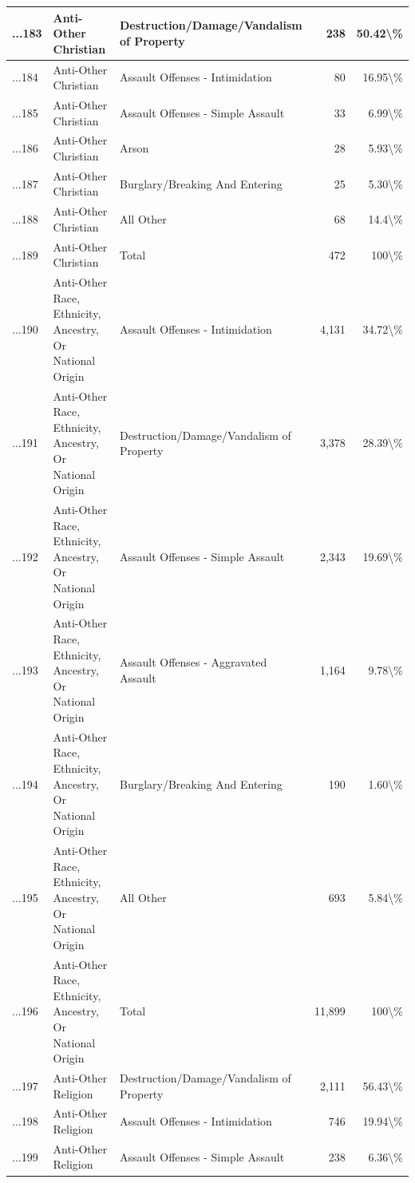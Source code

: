 \documentclass[
]{krantz}
\begin{document}
\begin{longtable}[t]{l|l|l|r|r}
\hline
...183 & Anti-Other Christian & Destruction/Damage/Vandalism of Property & 238 & 50.42\textbackslash{}\%\\
\hline
...184 & Anti-Other Christian & Assault Offenses - Intimidation & 80 & 16.95\textbackslash{}\%\\
\hline
...185 & Anti-Other Christian & Assault Offenses - Simple Assault & 33 & 6.99\textbackslash{}\%\\
\hline
...186 & Anti-Other Christian & Arson & 28 & 5.93\textbackslash{}\%\\
\hline
...187 & Anti-Other Christian & Burglary/Breaking And Entering & 25 & 5.30\textbackslash{}\%\\
\hline
...188 & Anti-Other Christian & All Other & 68 & 14.4\textbackslash{}\%\\
\hline
...189 & Anti-Other Christian & Total & 472 & 100\textbackslash{}\%\\
\hline
...190 & Anti-Other Race, Ethnicity, Ancestry, Or National Origin & Assault Offenses - Intimidation & 4,131 & 34.72\textbackslash{}\%\\
\hline
...191 & Anti-Other Race, Ethnicity, Ancestry, Or National Origin & Destruction/Damage/Vandalism of Property & 3,378 & 28.39\textbackslash{}\%\\
\hline
...192 & Anti-Other Race, Ethnicity, Ancestry, Or National Origin & Assault Offenses - Simple Assault & 2,343 & 19.69\textbackslash{}\%\\
\hline
...193 & Anti-Other Race, Ethnicity, Ancestry, Or National Origin & Assault Offenses - Aggravated Assault & 1,164 & 9.78\textbackslash{}\%\\
\hline
...194 & Anti-Other Race, Ethnicity, Ancestry, Or National Origin & Burglary/Breaking And Entering & 190 & 1.60\textbackslash{}\%\\
\hline
...195 & Anti-Other Race, Ethnicity, Ancestry, Or National Origin & All Other & 693 & 5.84\textbackslash{}\%\\
\hline
...196 & Anti-Other Race, Ethnicity, Ancestry, Or National Origin & Total & 11,899 & 100\textbackslash{}\%\\
\hline
...197 & Anti-Other Religion & Destruction/Damage/Vandalism of Property & 2,111 & 56.43\textbackslash{}\%\\
\hline
...198 & Anti-Other Religion & Assault Offenses - Intimidation & 746 & 19.94\textbackslash{}\%\\
\hline
...199 & Anti-Other Religion & Assault Offenses - Simple Assault & 238 & 6.36\textbackslash{}\%\\

\end{longtable}
\end{document}
